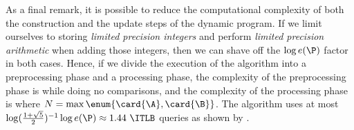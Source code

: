 As a final remark, it is possible to reduce the computational
complexity of both the construction and the update steps of the dynamic program. If
we limit ourselves to storing \emph{limited precision integers} and perform
\emph{limited precision arithmetic} when adding those integers, then we can
shave off the \(\log e(\P)\) factor in both cases. Hence, if we divide the
execution of the algorithm into a preprocessing phase and a processing phase,
the complexity of the preprocessing phase is \BigO{\card{\A}\card{\B}} while doing no
comparisons, and the complexity of the processing phase is 
where \(N = \max \enum{\card{\A},\card{\B}}\). The algorithm uses at most
\(\log(\frac{1+\sqrt{5}}{2})^{-1} \log e(\P) \approx 1.44~\ITLB\)
queries as shown by \citet*{linial:1984}.

